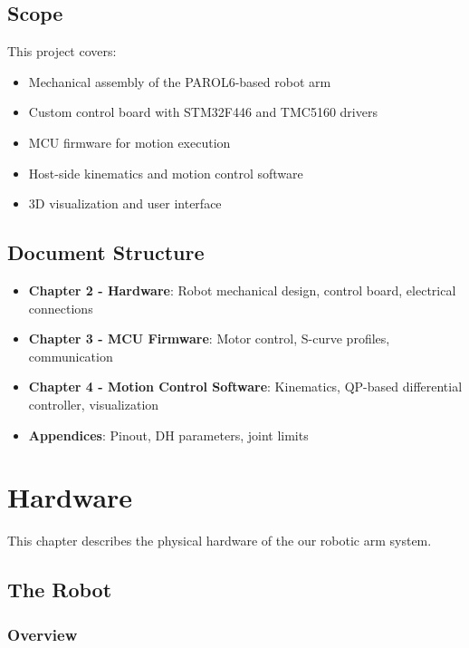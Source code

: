 \documentclass[12pt,a4paper]{report}
\begin{document}
\section{Scope}

This project covers:
\begin{itemize}
    \item Mechanical assembly of the PAROL6-based robot arm
    \item Custom control board with STM32F446 and TMC5160 drivers
    \item MCU firmware for motion execution
    \item Host-side kinematics and motion control software
    \item 3D visualization and user interface
\end{itemize}

\section{Document Structure}

\begin{itemize}
    \item \textbf{Chapter 2 - Hardware}: Robot mechanical design, control board, electrical connections
    \item \textbf{Chapter 3 - MCU Firmware}: Motor control, S-curve profiles, communication
    \item \textbf{Chapter 4 - Motion Control Software}: Kinematics, QP-based differential controller, visualization
    \item \textbf{Appendices}: Pinout, DH parameters, joint limits
\end{itemize}


\chapter{Hardware}

This chapter describes the physical hardware of the our robotic arm system.

\section{The Robot}

\subsection{Overview}
\end{document}
